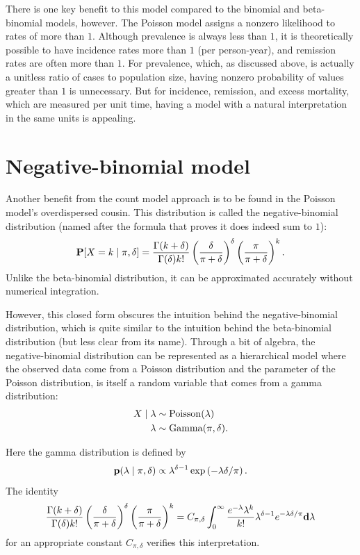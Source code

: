 There is one key benefit to this model compared to the binomial and
beta-binomial models, however.  The Poisson model assigns a nonzero
likelihood to rates of more than $1$.  Although prevalence is always
less than $1$, it is theoretically possible to have incidence rates
more than $1$ (per person-year), and remission rates are often more
than $1$.  For prevalence, which, as discussed above, is actually a
unitless ratio of cases to population size, having nonzero probability
of values greater than $1$ is unnecessary.  But for incidence,
remission, and excess mortality, which are measured per unit time,
having a model with a natural interpretation in the same units is
appealing.


\section{Negative-binomial model}
Another benefit from the count model approach is to be found in the
Poisson model's overdispersed cousin.  This distribution is called
the negative-binomial distribution (named after the formula that
proves it does indeed sum to $1$):
\[
\mathbf{P}[X = k\;|\; \pi, \delta] =
 \frac{\Gamma(k+\delta)}{\Gamma(\delta)k!} \left(\frac{\delta}{\pi+\delta}\right)^\delta \left(\frac{\pi}{\pi+\delta}\right)^k.
\]
Unlike the beta-binomial distribution, it can be approximated
accurately without numerical integration.

However, this closed form obscures the intuition behind the
negative-binomial distribution, which is quite similar to the
intuition behind the beta-binomial distribution (but less clear from
its name). Through a bit of algebra, the negative-binomial
distribution can be represented as a hierarchical model where the
observed data come from a Poisson distribution and the parameter of
the Poisson distribution, is itself a random variable that comes from a
gamma distribution:
\begin{align*}
X\;|\; \lambda &\sim \operatorname{Poisson}(\lambda)\\
\lambda &\sim \operatorname{Gamma}(\pi, \delta).
\end{align*}

Here the gamma distribution is defined by
\[
\mathbf{p}(\lambda \;|\; \pi, \delta) \propto \lambda^{\delta-1} \exp\left(-\lambda \delta/\pi \right).
\]
The identity
\[
\frac{\Gamma(k+\delta)}{\Gamma(\delta)k!} \left(\frac{\delta}{\pi+\delta}\right)^\delta \left(\frac{\pi}{\pi+\delta}\right)^k
=
 C_{\pi, \delta} \int_0^\infty \frac{e^{-\lambda}\lambda^k}{k!} \lambda^{\delta-1} e^{-\lambda \delta/\pi} \mathbf{d} \lambda
\]
for an appropriate constant $C_{\pi,\delta}$ verifies this interpretation.


